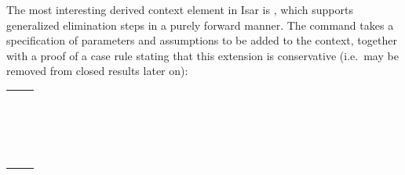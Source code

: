 \begin{isabellebody}
\begin{isamarkuptext}
  The most interesting derived context element in Isar is \hyperlink{command.obtain}{\mbox{}} \cite[\S5.3]{Wenzel-PhD}, which supports generalized
  elimination steps in a purely forward manner.  The \hyperlink{command.obtain}{\mbox{}}
  command takes a specification of parameters  and
  assumptions  to be added to the context, together
  with a proof of a case rule stating that this extension is
  conservative (i.e.\ may be removed from closed results later on):

  \medskip
  \begin{tabular}{l}
  \isa{{\isaliteral{22}{\isachardoublequote}}{\isaliteral{5C3C6C616E676C653E}{\isasymlangle}}facts{\isaliteral{5C3C72616E676C653E}{\isasymrangle}}{\isaliteral{22}{\isachardoublequote}}}~~\hyperlink{command.obtain}{\mbox{\isa{\isacommand{obtain}}}}~\isa{{\isaliteral{22}{\isachardoublequote}}\isaliteral{5C3C5E7665633E}{}\isactrlvec x\ {\isaliteral{5C3C57484552453E}{\isasymWHERE}}\ \isaliteral{5C3C5E7665633E}{}\isactrlvec A\ \isaliteral{5C3C5E7665633E}{}\isactrlvec x\ \ {\isaliteral{5C3C6C616E676C653E}{\isasymlangle}}proof{\isaliteral{5C3C72616E676C653E}{\isasymrangle}}\ {\isaliteral{5C3C65717569763E}{\isasymequiv}}{\isaliteral{22}{\isachardoublequote}}} \\[0.5ex]
  \quad \hyperlink{command.have}{\mbox{\isa{\isacommand{have}}}}~\isa{{\isaliteral{22}{\isachardoublequote}}case{\isaliteral{3A}{\isacharcolon}}\ {\isaliteral{5C3C416E643E}{\isasymAnd}}thesis{\isaliteral{2E}{\isachardot}}\ {\isaliteral{28}{\isacharparenleft}}{\isaliteral{5C3C416E643E}{\isasymAnd}}\isaliteral{5C3C5E7665633E}{}\isactrlvec x{\isaliteral{2E}{\isachardot}}\ \isaliteral{5C3C5E7665633E}{}\isactrlvec A\ \isaliteral{5C3C5E7665633E}{}\isactrlvec x\ {\isaliteral{5C3C4C6F6E6772696768746172726F773E}{\isasymLongrightarrow}}\ thesis{\isaliteral{29}{\isacharparenright}}\ {\isaliteral{5C3C4C6F6E6772696768746172726F773E}{\isasymLongrightarrow}}\ thesis{\isaliteral{5C3C72616E676C653E}{\isasymrangle}}{\isaliteral{22}{\isachardoublequote}}} \\
  \quad \hyperlink{command.proof}{\mbox{\isa{\isacommand{proof}}}}~\hyperlink{method.-}{\mbox{\isa{{\isaliteral{2D}{\isacharminus}}}}} \\
  \qquad \hyperlink{command.fix}{\mbox{\isa{\isacommand{fix}}}}~\isa{thesis} \\

\end{tabular}
\end{isamarkuptext}
\end{isabellebody}
